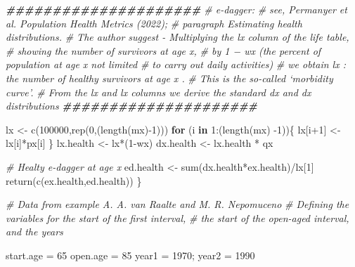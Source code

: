 \documentclass[
]{article}
\newenvironment{Shaded}{\begin{snugshade}}{\end{snugshade}}
\newcommand{\CommentTok}[1]{\textcolor[rgb]{0.56,0.35,0.01}{\textit{#1}}}
\newcommand{\ControlFlowTok}[1]{\textcolor[rgb]{0.13,0.29,0.53}{\textbf{#1}}}
\newcommand{\DecValTok}[1]{\textcolor[rgb]{0.00,0.00,0.81}{#1}}
\newcommand{\DocumentationTok}[1]{\textcolor[rgb]{0.56,0.35,0.01}{\textbf{\textit{#1}}}}
\newcommand{\FunctionTok}[1]{\textcolor[rgb]{0.00,0.00,0.00}{#1}}
\newcommand{\NormalTok}[1]{#1}
\newcommand{\OtherTok}[1]{\textcolor[rgb]{0.56,0.35,0.01}{#1}}
\newcommand{\SpecialCharTok}[1]{\textcolor[rgb]{0.00,0.00,0.00}{#1}}
\begin{document}
\begin{Shaded}
\begin{Highlighting}[]
  \DocumentationTok{\#\#\#\#\#\#\#\#\#\#\#\#\#\#\#\#\#\#\#\#\#}
  \CommentTok{\# e{-}dagger: }
  \CommentTok{\# see, Permanyer et al. Population Health Metrics (2022); }
  \CommentTok{\# paragraph Estimating health distributions.}
  \CommentTok{\# The author suggest {-} Multiplying the lx column of the life table,}
  \CommentTok{\# showing the number of survivors at age x,}
  \CommentTok{\# by 1 − wx (the percent of population at age x not limited }
  \CommentTok{\# to carry out daily activities) }
  \CommentTok{\# we obtain lx\textquotesingle{} : the   number of healthy survivors at age x . }
  \CommentTok{\# This is the so{-}called  ‘morbidity curve’. }
  \CommentTok{\# From the lx and lx\textquotesingle{} columns we derive the standard dx and dx\textquotesingle{} distributions}
  \DocumentationTok{\#\#\#\#\#\#\#\#\#\#\#\#\#\#\#\#\#\#\#\#\#}
  
\NormalTok{  lx }\OtherTok{\textless{}{-}} \FunctionTok{c}\NormalTok{(}\DecValTok{100000}\NormalTok{,}\FunctionTok{rep}\NormalTok{(}\DecValTok{0}\NormalTok{,(}\FunctionTok{length}\NormalTok{(mx)}\SpecialCharTok{{-}}\DecValTok{1}\NormalTok{)))}
  \ControlFlowTok{for}\NormalTok{ (i }\ControlFlowTok{in} \DecValTok{1}\SpecialCharTok{:}\NormalTok{(}\FunctionTok{length}\NormalTok{(mx) }\SpecialCharTok{{-}}\DecValTok{1}\NormalTok{))\{}
\NormalTok{    lx[i}\SpecialCharTok{+}\DecValTok{1}\NormalTok{] }\OtherTok{\textless{}{-}}\NormalTok{ lx[i]}\SpecialCharTok{*}\NormalTok{px[i] \}}
\NormalTok{  lx.health }\OtherTok{\textless{}{-}}\NormalTok{ lx}\SpecialCharTok{*}\NormalTok{(}\DecValTok{1}\SpecialCharTok{{-}}\NormalTok{wx)}
\NormalTok{  dx.health }\OtherTok{\textless{}{-}}\NormalTok{ lx.health }\SpecialCharTok{*}\NormalTok{ qx}
  
  \CommentTok{\# Healty e{-}dagger at age x}
\NormalTok{  ed.health }\OtherTok{\textless{}{-}} \FunctionTok{sum}\NormalTok{(dx.health}\SpecialCharTok{*}\NormalTok{ex.health)}\SpecialCharTok{/}\NormalTok{lx[}\DecValTok{1}\NormalTok{] }
  \FunctionTok{return}\NormalTok{(}\FunctionTok{c}\NormalTok{(ex.health,ed.health))}
\NormalTok{\}}


\CommentTok{\# Data from example A. A. van Raalte and M. R. Nepomuceno}
\CommentTok{\# Defining the variables for the start of the first interval, }
\CommentTok{\# the start of the open{-}aged interval, and the years}

\NormalTok{start.age }\OtherTok{=} \DecValTok{65}
\NormalTok{open.age }\OtherTok{=} \DecValTok{85}
\NormalTok{year1 }\OtherTok{=} \DecValTok{1970}\NormalTok{; year2 }\OtherTok{=} \DecValTok{1990}


\end{Highlighting}
\end{Shaded}
\end{document}
